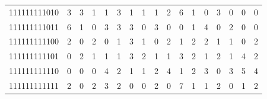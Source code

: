 \documentclass[10pt,a4paper]{article}
\begin{document}
\begin{longtable}{ |c|c|c|c|c|c|c|c|c|c|c|c|c|c|c|c|c| }
    111111111010              & 3                            & 3                                & 1                            & 1                              & 3   & 1   & 1   & 1   & 2   & 6   & 1   & 0   & 3   & 0   & 0   & 0   \\
    111111111011              & 6                            & 1                                & 0                            & 3                              & 3   & 3   & 0   & 3   & 0   & 0   & 1   & 4   & 0   & 2   & 0   & 0   \\
    111111111100              & 2                            & 0                                & 2                            & 0                              & 1   & 3   & 1   & 0   & 2   & 1   & 2   & 2   & 1   & 1   & 0   & 2   \\
    111111111101              & 0                            & 2                                & 1                            & 1                              & 1   & 3   & 2   & 1   & 1   & 3   & 2   & 1   & 2   & 1   & 4   & 2   \\
    111111111110              & 0                            & 0                                & 0                            & 4                              & 2   & 1   & 1   & 2   & 4   & 1   & 2   & 3   & 0   & 3   & 5   & 4   \\
    111111111111              & 2                            & 0                                & 2                            & 3                              & 2   & 0   & 0   & 2   & 0   & 7   & 1   & 1   & 2   & 0   & 1   & 2   \\
    \hline
\end{longtable}

\newpage
\end{document}
